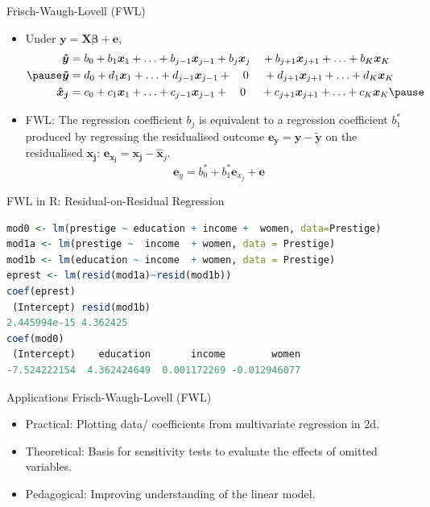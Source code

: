 \documentclass[aspectratio=169, handout, t]{beamer}
\numberwithin{equation}{section}
\begin{document}
\begin{frame}{Frisch-Waugh-Lovell (FWL)}
\begin{itemize}
\item Under $\bm{y} = \bm{X\beta}+\bm{e}$,
\begin{align*}
\bm{\hat{y}} &=b_0+ b_1\bm{x}_1+\ldots + b_{j-1} \bm{x}_{j-1} + b_{j} \bm{x}_{j}\quad + b_{j+1} \bm{x}_{j+1}+  \ldots+b_{K} \bm{x}_{K}\\\pause
\bm{\tilde{y}} &= d_0+ d_1\bm{x}_1+\ldots + d_{j-1} \bm{x}_{j-1} + \quad0\quad \ + d_{j+1} \bm{x}_{j+1}+  \ldots+d_{K} \bm{x}_{K}\\
\bm{\hat{x}_j} &= c_0+ c_1\bm{x}_1+\ldots + c_{j-1} \bm{x}_{j-1}+ \quad0\quad \ +  c_{j+1} \bm{x}_{j+1}+ \ldots+c_{K} \bm{x}_{K}\pause
\end{align*}
\item FWL: The regression coefficient $b_j$ is equivalent to a regression coefficient $b^{*}_1$ produced by regressing the residualised outcome $\bm{e_y}=\bm{y}-\bm{\tilde{y}}$ on the residualised $\bm{x_j}$: $\bm{e_{x_j}}=\bm{x_j}-\bm{\hat{x}}_j$.
$$\bm{e}_y= b^*_0+ b^*_1\bm{e}_{x_j}+\bm{e}$$
\end{itemize}
\end{frame}




\begin{frame}[fragile]{FWL in R: Residual-on-Residual Regression}
  \begin{lstlisting}[language=R]
mod0 <- lm(prestige ~ education + income +  women, data=Prestige)
mod1a <- lm(prestige ~  income  + women, data = Prestige)
mod1b <- lm(education ~ income  + women, data = Prestige)
eprest <- lm(resid(mod1a)~resid(mod1b))
coef(eprest)
 (Intercept) resid(mod1b) 
2.445994e-15 4.362425
coef(mod0)
 (Intercept)    education       income        women 
-7.524222154  4.362424649  0.001172269 -0.012946077 
\end{lstlisting} 
\end{frame}

\begin{frame}{Applications Frisch-Waugh-Lovell (FWL)}
\begin{itemize}
\item Practical: Plotting data/ coefficients from multivariate regression in 2d.
\item Theoretical: Basis for sensitivity tests to evaluate the effects of omitted variables.
\item Pedagogical: Improving understanding of the linear model.
\end{itemize}
\end{frame}
\end{document}
